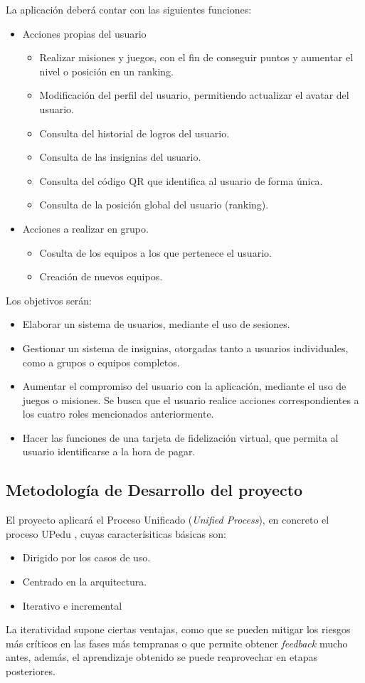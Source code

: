 \documentclass[twoside]{report}
\begin{document}
La aplicación deberá contar con las siguientes funciones:
\begin{itemize}
\item Acciones propias del usuario
	\begin{itemize}
	\item Realizar misiones y juegos, con el fin de conseguir puntos y aumentar el nivel o posición en un ranking.
	\item Modificación del perfil del usuario, permitiendo actualizar el avatar del usuario.
	\item Consulta del historial de logros del usuario.
	\item Consulta de las insignias del usuario.
	\item Consulta del código QR que identifica al usuario de forma única.
	\item Consulta de la posición global del usuario (ranking).
	\end{itemize}
\item Acciones a realizar en grupo.
	\begin{itemize}
	\item Cosulta de los equipos a los que pertenece el usuario.
	\item Creación de nuevos equipos.
	\end{itemize}
\end{itemize}

Los objetivos serán:
\begin{itemize}
	\item Elaborar un sistema de usuarios, mediante el uso de sesiones.
	\item Gestionar un sistema de insignias, otorgadas tanto a usuarios individuales, como a grupos o equipos completos.
	\item Aumentar el compromiso del usuario con la aplicación, mediante el uso de juegos o misiones. Se busca que el usuario realice acciones correspondientes a los cuatro roles mencionados anteriormente.
	\item Hacer las funciones de una tarjeta de fidelización virtual, que permita al usuario identificarse a la hora de pagar.
\end{itemize}

\subsection{Metodología de Desarrollo del proyecto}
El proyecto aplicará el Proceso Unificado (\textit{Unified Process}), en concreto el proceso UPedu \cite{upedu}, cuyas caracterísiticas básicas \cite{pgpup} son: 
\begin{itemize}
\item Dirigido por los casos de uso.
\item Centrado en la arquitectura.
\item Iterativo e incremental
\end{itemize}
La iteratividad supone ciertas ventajas, como que se pueden mitigar los riesgos más críticos en las fases más tempranas o que permite obtener \textit{feedback} mucho antes, además, el aprendizaje obtenido se puede reaprovechar en etapas posteriores.
\end{document}
